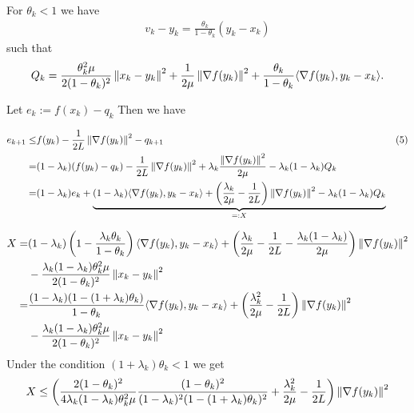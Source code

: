 \documentclass[english,12pt,a4paper]{article}
\begin{document}
For $\theta_k<1$ we have 
%
\begin{align*}
v_k -y_k = \frac{\theta_k}{1-\theta_k}(y_k-x_k)
\end{align*}
%
such that
%
\begin{align*}
Q_{k} = \frac{\theta_k^2\mu}{2(1-\theta_k)^2}\left\|x_k -y_k\right\|^2 + \frac{1}{2\mu}\left\|\nabla f(y_k)\right\|^2+ \frac{\theta_k}{1-\theta_k}\langle\nabla f(y_k),y_k -x_k\rangle.
\end{align*}

Let $e_k:=f(x_k) -q_k$ Then we have

\begin{align*}
e_{k+1}\le& f(y_k) - \frac{1}{2L} \left\|\nabla f(y_k)\right\|^2 - q_{k+1} & (5)\\
=&  (1-\lambda_k)(f(y_k) -q_k)  - \frac{1}{2L} \left\|\nabla f(y_k)\right\|^2 + \lambda_k\frac{\left\|\nabla f(y_k)\right\|^2}{2\mu} - \lambda_k(1-\lambda_k)Q_{k}\\
=&  (1-\lambda_k)e_k + \underbrace{(1-\lambda_k)\langle\nabla f(y_k),y_k-x_k\rangle  +\left(\frac{\lambda_k}{2\mu}- \frac{1}{2L}\right) \left\|\nabla f(y_k)\right\|^2 - \lambda_k(1-\lambda_k)Q_{k}}_{=:X}
\end{align*}

%
\begin{align*}
X =& (1-\lambda_k)\left(1-\frac{\lambda_k\theta_k}{1-\theta_k}\right)\langle\nabla f(y_k),y_k-x_k\rangle + \left(\frac{\lambda_k}{2\mu}- \frac{1}{2L} - \frac{\lambda_k(1-\lambda_k)}{2\mu}\right) \left\|\nabla f(y_k)\right\|^2 \\&- \frac{\lambda_k(1-\lambda_k)\theta_k^2\mu}{2(1-\theta_k)^2}\left\|x_k -y_k\right\|^2\\
=& \frac{(1-\lambda_k)(1-(1+\lambda_k)\theta_k)}{1-\theta_k}\langle\nabla f(y_k),y_k-x_k\rangle + \left(\frac{\lambda_k^2}{2\mu}- \frac{1}{2L}\right) \left\|\nabla f(y_k)\right\|^2 \\&- \frac{\lambda_k(1-\lambda_k)\theta_k^2\mu}{2(1-\theta_k)^2}\left\|x_k -y_k\right\|^2
\end{align*}
%
Under the condition $(1+\lambda_k)\theta_k<1$ we get
%
\begin{align*}
X \le \left(\frac{2(1-\theta_k)^2}{4\lambda_k(1-\lambda_k)\theta_k^2\mu}\frac{(1-\theta_k)^2}{(1-\lambda_k)^2(1-(1+\lambda_k)\theta_k)^2} + \frac{\lambda_k^2}{2\mu}- \frac{1}{2L}\right) \left\|\nabla f(y_k)\right\|^2
\end{align*}
%









\end{document}
